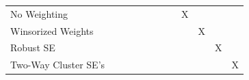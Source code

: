 \begin{center}
{\begin{tabular}{l*{11}{c}}
No Weighting        &              &              &              &              &              &              &              &           X  &              &              &              \\
Winsorized Weights  &              &              &              &              &              &              &              &              &           X  &              &              \\
Robust SE           &              &              &              &              &              &              &              &              &              &           X  &              \\
Two-Way Cluster SE's&              &              &              &              &              &              &              &              &              &              &           X  \\
\bottomrule
\end{tabular}
}
\end{center}
